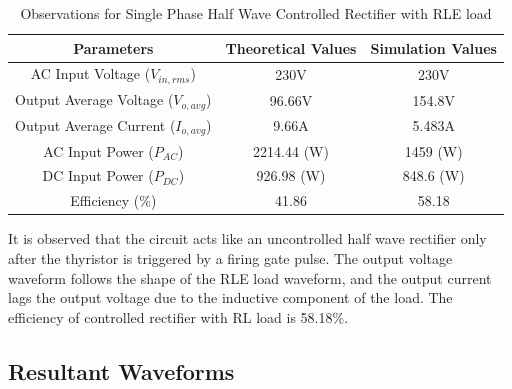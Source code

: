 \begin{table}[h]
    \renewcommand{\arraystretch}{1.3}
    \label{table_observation_single-phase-half-wave-controlled-rectifier-with-RLE-load}
    \centering
    \begin{tabular}{|c|c|c|}
        \hline
        Parameters                              & Theoretical Values & Simulation Values \\
        \hline
        \hline
        AC Input Voltage ($ V_{in,rms} $)       & 230V               & 230V              \\
        \hline
        Output Average Voltage ($ V_{o,avg} $)  & 96.66V             & 154.8V            \\
        \hline
        Output Average Current ($ I_{o,avg}  $) & 9.66A              & 5.483A            \\
        \hline
        AC Input Power ($ P_{AC}  $)            & 2214.44 (W)        & 1459 (W)          \\
        \hline
        DC Input Power ($ P_{DC}  $)            & 926.98 (W)         & 848.6 (W)         \\
        \hline
        Efficiency (\%)                         & 41.86              & 58.18             \\
        \hline
    \end{tabular}
    \caption{Observations for Single Phase Half Wave Controlled Rectifier with RLE load}

\end{table}


It is observed that the circuit acts like an uncontrolled half wave rectifier only after the thyristor is triggered by a firing gate pulse. The output voltage waveform follows the shape of the RLE load waveform, and the output current lags the output voltage due to the inductive component of the load.
The efficiency of controlled rectifier with RL load is 58.18\%.





\subsection{Resultant Waveforms}

